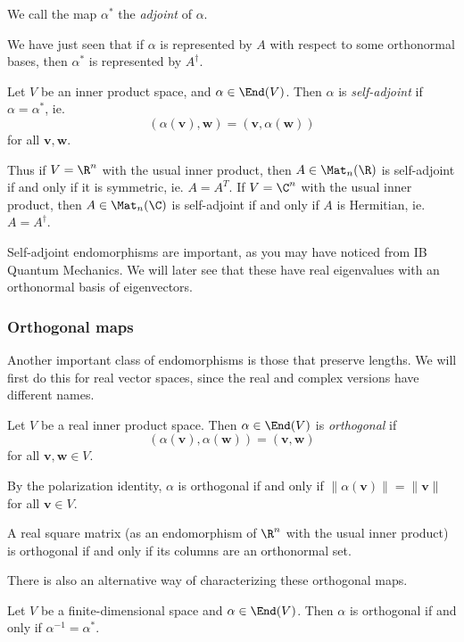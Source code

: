 \documentclass[a4paper]{article}
\begin{document}
\begin{defi}[Adjoint]
  We call the map $\alpha^*$ the \emph{adjoint} of $\alpha$.
\end{defi}
We have just seen that if $\alpha$ is represented by $A$ with respect to some orthonormal bases, then $\alpha^*$ is represented by $A^\dagger$.

\begin{defi}
  Let $V$ be an inner product space, and $\alpha \in \End(V)$. Then $\alpha$ is \emph{self-adjoint} if $\alpha = \alpha^*$, ie.
  \[
    (\alpha(\mathbf{v}), \mathbf{w}) = (\mathbf{v}, \alpha(\mathbf{w}))
  \]
  for all $\mathbf{v}, \mathbf{w}$.
\end{defi}
Thus if $V = \R^n$ with the usual inner product, then $A \in \Mat_n(\R)$ is self-adjoint if and only if it is symmetric, ie. $A = A^T$. If $V = \C^n$ with the usual inner product, then $A \in \Mat_n(\C)$ is self-adjoint if and only if $A$ is Hermitian, ie. $A = A^\dagger$.

Self-adjoint endomorphisms are important, as you may have noticed from IB Quantum Mechanics. We will later see that these have real eigenvalues with an orthonormal basis of eigenvectors.

\subsubsection*{Orthogonal maps}
Another important class of endomorphisms is those that preserve lengths. We will first do this for real vector spaces, since the real and complex versions have different names.
\begin{defi}
  Let $V$ be a real inner product space. Then $\alpha \in \End(V)$ is \emph{orthogonal} if
  \[
    (\alpha(\mathbf{v}), \alpha(\mathbf{w})) = (\mathbf{v}, \mathbf{w})
  \]
  for all $\mathbf{v}, \mathbf{w} \in V$.
\end{defi}
By the polarization identity, $\alpha$ is orthogonal if and only if $\|\alpha(\mathbf{v})\| = \|\mathbf{v}\|$ for all $\mathbf{v} \in V$.

A real square matrix (as an endomorphism of $\R^n$ with the usual inner product) is orthogonal if and only if its columns are an orthonormal set.

There is also an alternative way of characterizing these orthogonal maps.

\begin{lemma}
  Let $V$ be a finite-dimensional space and $\alpha \in \End(V)$. Then $\alpha$ is orthogonal if and only if $\alpha^{-1} = \alpha^*$.
\end{lemma}
\end{document}
